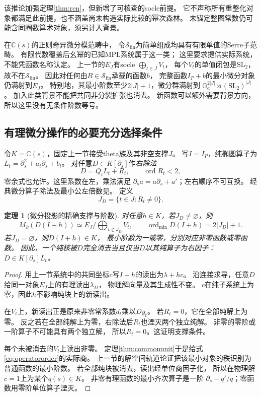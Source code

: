 \documentclass[11pt,a4paper]{ctexart}
\theoremstyle{cnplain}\newtheorem{theorem}{定理}[section]
\theoremstyle{definition}\newtheorem{definition}[theorem]{定义}
\theoremstyle{remark}\newtheorem{remark}[theorem]{注}
\newcommand{\cS}{\mathcal S}\newcommand{\dR}{\mathrm{dR}}
\begin{document}
该推论加强定理\ref{thm:ren}，但新增了可核查的socle前提。
它不声称所有重整化对象都满足此前提，也不涵盖尚未构造实际比较的幂次森林。
未锚定整图常数仍可能含同圈数算术对象，须另计入背景。

在$\mathbb C(s)$的正则奇异微分模范畴中，
令$\cS_{\mathrm{fin}}$为简单组成均具有有限单值的Serre子范畴。
有限代数覆盖后幺幂的已知MPL系统属于这一类；
这里要求提供实际系统，不能凭函数名称认定。
上一节的$E_J$有socle $\bigoplus_{t\in J}V_t$，
每个$V_t$的单值闭包是$\mathrm{SL}_2$，故不在$\cS_{\mathrm{fin}}$。
因此对任何由$B\in\cS_{\mathrm{fin}}$承载的函数$b$，
完整函数$I_P+b$的最小微分对象仍满射到$E_J$。
特别地，其最小阶数至少$2|J|+1$，微分群满射到
$\mathbb G_a^{2|J|}\rtimes(\mathrm{SL}_2)^{|J|}$。
加入此类背景不能把共同非分裂扩张也消去。
新函数可以额外需要背景方向，所以这里没有无条件阶数等号。

\subsection{有理微分操作的必要充分选择条件}
令$K=\mathbb C(s)$，固定上一节接受theta族及其非空支撑$J$。
写$I=I_P$，纯椭圆算子为
$L_t=\partial_s^2+a_t\partial_s+b_t$。
对任意$D\in K[\partial_s]$作\emph{右除法}
\begin{equation}\label{eq:oreremainder}
 D=Q_tL_t+R_t,\qquad \operatorname{ord}R_t<2,
\end{equation}
零余式也允许。这里系数在左，乘法满足
$\partial_s a=a\partial_s+a'$；左右顺序不可互换。
经典微分算子除法及最小公左倍数见\cite[\S1.2]{Singer}。
定义
\[
 J_D=\{t\in J:R_t\ne0\}.
\]

\begin{theorem}[微分投影的精确支撑与阶数]\label{thm:differentialselection}
对任意$h\in K$，若$J_D\ne\varnothing$，则
\begin{equation}\label{eq:operatororder}
 M_\partial\!\left(D(I+h)\right)
 \simeq E_J\big/\bigoplus_{t\notin J_D}V_t,\qquad
 \operatorname{ord}_{\min}D(I+h)=2|J_D|+1.
\end{equation}
若$J_D=\varnothing$，则$D(I+h)\in K$，
最小阶数为一或零，分别对应非零函数或零函数。
因此，一个纯核被$D$完全消去当且仅当$D$以其纯算子为右因子：
$D\in K[\partial_s]L_t$。
\end{theorem}
\begin{proof}
用上一节系统中的共同坐标$c$写$I+h$的读出为$\lambda+hc$。
沿连接求导，任意$D$给同一对象$E_J$上的有理读出$\lambda_D$，
物理解向量及其生成性不变。
$c$在纯子系统上为零，因此$h$不影响纯块上的新读出。

在$V_t$上，新读出正是原来非零常系数$d_t$乘以$D y_t$。
若$R_t=0$，它在全部纯解上为零。
反之若在全部纯解上为零，右除法后$R_t$也湮灭两个独立纯解。
非零的零阶或一阶算子不可能具有两个独立解，
所以$R_t=0$。这证明支撑条件。

每个未被消去的$V_t$上读出非零。
定理\ref{thm:commonunit}于是给式\eqref{eq:operatororder}的实际商。
上一节的解空间轨道论证把该最小对象的秩识别为普通函数的最小阶数。
若全部纯块被消去，读出经单位商因子化，
所以在物理解$c=1$上为某个$q(s)\in K$。
非零有理函数的最小齐次算子是一阶
$\partial_s-q'/q$；零函数用零阶单位算子湮灭。
\end{proof}
\end{document}
